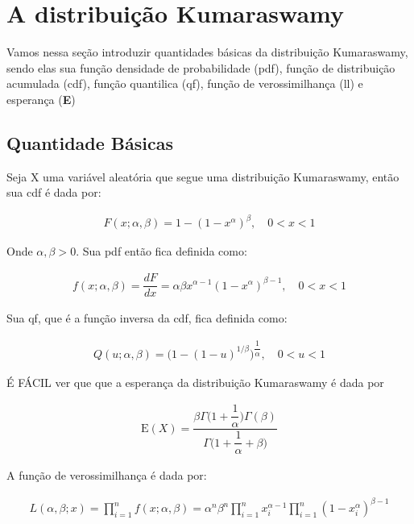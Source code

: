 \documentclass[
]{article}
\begin{document}
\section{\centering A distribuição Kumaraswamy}

Vamos nessa seção introduzir quantidades básicas da distribuição
Kumaraswamy, sendo elas sua função densidade de probabilidade (pdf),
função de distribuição acumulada (cdf), função quantilica (qf), função
de verossimilhança (ll) e esperança (\textbf{E})

\subsection{Quantidade Básicas}

Seja X uma variável aleatória que segue uma distribuição Kumaraswamy,
então sua cdf é dada por:

\begin{align}
F(x;\alpha, \beta) = 1 - (1 - x^\alpha)^\beta,  \quad 0 < x< 1
\end{align}

Onde \(\alpha, \beta > 0\). Sua pdf então fica definida como:

\begin{align}
f(x;\alpha, \beta) = \dfrac{dF}{dx} =\alpha\beta x^{\alpha - 1}(1 - x^\alpha)^{\beta  - 1}, \quad 0 < x< 1
\end{align}

Sua qf, que é a função inversa da cdf, fica definida como:

\begin{align}
Q(u;\alpha, \beta) = \bigg(1 - (1 - u)^{1/\beta}\bigg)^{\dfrac{1}{\alpha}}, \quad 0<u<1
\end{align}

É FÁCIL ver que que a esperança da distribuição Kumaraswamy é dada por

\begin{align}
\text{E}(X) = \dfrac{\beta\Gamma\bigg(1 + \dfrac{1}{\alpha}\bigg)\Gamma(\beta)}{\Gamma\bigg(1 + \dfrac{1}{\alpha} + \beta\bigg)}
\end{align}

A função de verossimilhança é dada por:

\begin{align}
L(\alpha, \beta; x) = \prod_{i=1}^{n}f(x;\alpha, \beta) = \alpha^n \beta^n \prod_{i=1}^{n}x_i^{\alpha - 1}\prod_{i=1}^{n}(1-x_i^{\alpha})^{\beta-1}
\end{align}
\end{document}
